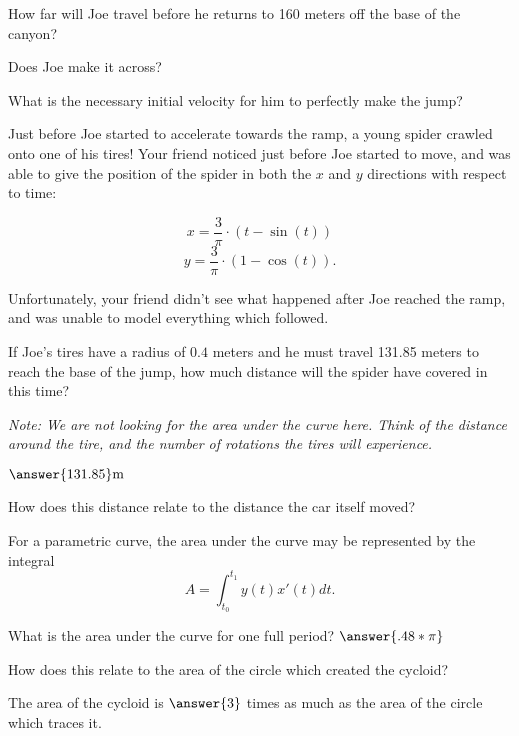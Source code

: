\documentclass{ximera}
\begin{document}
\begin{question}
How far will Joe travel before he returns to 160 meters off the base of the canyon?
\begin{multipleChoice}
\end{multipleChoice}

Does Joe make it across?
\begin{multipleChoice}
\end{multipleChoice}

What is the necessary initial velocity for him to perfectly make the jump?
\begin{multipleChoice}
\end{multipleChoice}

\end{question}
\begin{question}
Just before Joe started to accelerate towards the ramp, a young spider crawled onto one of his tires! Your friend noticed just before Joe started to move, and was able to give the position of the spider in both the $x$ and $y$ directions with respect to time:

$$x = \dfrac{3}{\pi} \cdot (t - \sin(t))$$ $$y = \dfrac{3}{\pi} \cdot (1 - \cos(t))\text{.}$$

Unfortunately, your friend didn't see what happened after Joe reached the ramp, and was unable to model everything which followed.

If Joe's tires have a radius of $0.4$ meters and he must travel 131.85 meters to reach the base of the jump, how much distance will the spider have covered in this time?

\textit{Note: We are not looking for the area under the curve here. Think of the distance around the tire, and the number of rotations the tires will experience.}

$\answer{131.85} \text{m}$

How does this distance relate to the distance the car itself moved?
\begin{multipleChoice}
\end{multipleChoice}

For a parametric curve, the area under the curve may be represented by the integral $$A = \int_{t_0}^{t_1} y(t)x'(t) dt \text{.}$$

What is the area under the curve for one full period?
$\answer{.48*\pi}$


How does this relate to the area of the circle which created the cycloid?
\begin{center}
The area of the cycloid is $\answer{3}$ times as much as the area of the circle which traces it.
\end{center}
\end{question}
\end{document}
